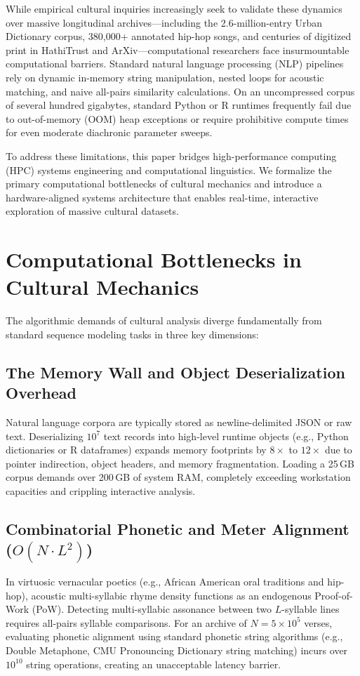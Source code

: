 \documentclass[11pt,a4paper]{article}
\begin{document}
While empirical cultural inquiries increasingly seek to validate these dynamics over massive longitudinal archives—including the 2.6-million-entry Urban Dictionary corpus, 380,000+ annotated hip-hop songs, and centuries of digitized print in HathiTrust and ArXiv—computational researchers face insurmountable computational barriers. Standard natural language processing (NLP) pipelines rely on dynamic in-memory string manipulation, nested loops for acoustic matching, and naive all-pairs similarity calculations. On an uncompressed corpus of several hundred gigabytes, standard Python or R runtimes frequently fail due to out-of-memory (OOM) heap exceptions or require prohibitive compute times for even moderate diachronic parameter sweeps.

To address these limitations, this paper bridges high-performance computing (HPC) systems engineering and computational linguistics. We formalize the primary computational bottlenecks of cultural mechanics and introduce a hardware-aligned systems architecture that enables real-time, interactive exploration of massive cultural datasets.

\section{Computational Bottlenecks in Cultural Mechanics}

The algorithmic demands of cultural analysis diverge fundamentally from standard sequence modeling tasks in three key dimensions:

\subsection{The Memory Wall and Object Deserialization Overhead}
Natural language corpora are typically stored as newline-delimited JSON or raw text. Deserializing $10^7$ text records into high-level runtime objects (e.g., Python dictionaries or R dataframes) expands memory footprints by $8\times$ to $12\times$ due to pointer indirection, object headers, and memory fragmentation. Loading a 25\,GB corpus demands over 200\,GB of system RAM, completely exceeding workstation capacities and crippling interactive analysis.

\subsection{Combinatorial Phonetic and Meter Alignment ($O(N \cdot L^2)$)}
In virtuosic vernacular poetics (e.g., African American oral traditions and hip-hop), acoustic multi-syllabic rhyme density functions as an endogenous Proof-of-Work (PoW). Detecting multi-syllabic assonance between two $L$-syllable lines requires all-pairs syllable comparisons. For an archive of $N = 5 \times 10^5$ verses, evaluating phonetic alignment using standard phonetic string algorithms (e.g., Double Metaphone, CMU Pronouncing Dictionary string matching) incurs over $10^{10}$ string operations, creating an unacceptable latency barrier.
\end{document}
